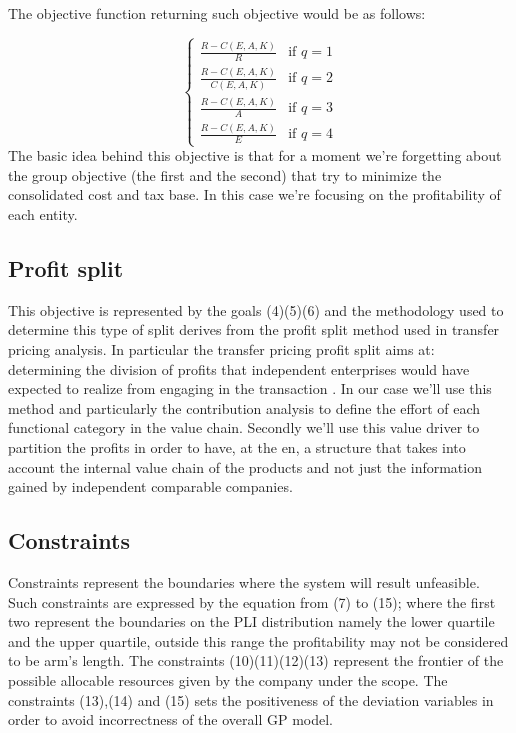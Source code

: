\documentclass{article}
\begin{document}
The objective function returning such objective would be as follows:

\[
\begin{cases}
   \frac{R - C(E,A,K)}{R} & \text{if } q=1
   \\
   \frac{R - C(E,A,K)}{C(E,A,K)} & \text{if } q=2
   \\
   \frac{R - C(E,A,K)}{A} & \text{if } q=3
   \\
   \frac{R - C(E,A,K)}{E} & \text{if } q=4
\end{cases}
\]
The basic idea behind this objective is that for a moment we're forgetting about the group objective (the first and the second) that try to minimize the consolidated cost and tax base. In this case we're focusing on the profitability of each entity.

\subsection{Profit split}
This objective is represented by the goals (4)(5)(6) and the methodology used to determine this type of split derives from the profit split method used in transfer pricing analysis. In particular the transfer pricing profit split aims at: determining the division of profits that independent enterprises would have expected to realize from engaging in the transaction \cite{oecd_oecd_????}. In our case we'll use this method and particularly the contribution analysis to define the effort of each functional category in the value chain. Secondly we'll use this value driver to partition the profits in order to have, at the en, a structure that takes into account the internal value chain of the products and not just the information gained by independent comparable companies.

\subsection{Constraints}
Constraints represent the boundaries where the system will result unfeasible. Such constraints are expressed by the equation from (7) to (15); where the first two represent the boundaries on the PLI distribution namely the lower quartile and the upper quartile, outside this range the profitability may not be considered to be arm's length. The constraints (10)(11)(12)(13) represent the frontier of the possible allocable resources given by the company under the scope. The constraints (13),(14) and (15) sets the positiveness of the deviation variables in order to avoid incorrectness of the overall GP model.
\end{document}
